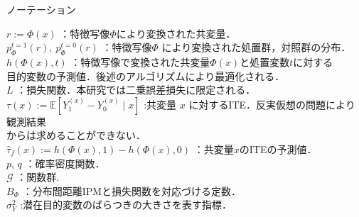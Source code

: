 \documentclass[dvipdfmx]{jreport}
\begin{document}
\begin{itembox}[l]{\large{ノーテーション}}
\begin{tabbing}
        \hspace{15pt} \raisebox{0.5ex}{\tiny $\bullet$} $r:=\Phi(x)$ \>：特徴写像$\Phi$により変換された共変量．\\[0.5em]
        \hspace{15pt} \raisebox{0.5ex}{\tiny $\bullet$} $p^{t=1}_\Phi(r),\ p^{t=0}_\Phi(r)$ \>：特徴写像$\Phi$ により変換された処置群，対照群の分布．\\[0.5em]
        \hspace{15pt} \raisebox{0.5ex}{\tiny $\bullet$} $h(\Phi(x), t)$ \> ：特徴写像で変換された共変量$\Phi(x)$と処置変数$t$に対する\\[0.5em]\>\hspace{6.5pt}目的変数の予測値．後述のアルゴリズムにより最適化される．\\[0.5em]
        \hspace{15pt} \raisebox{0.5ex}{\tiny $\bullet$} $L$ \>：損失関数．本研究では二乗誤差損失に限定される． \\[0.5em]
        \hspace{15pt} \raisebox{0.5ex}{\tiny $\bullet$} $\tau(x) := \mathbb{E}[Y_1^{(x)} - Y_0^{(x)} \mid x]$ \>:共変量 $x$ に対するITE．反実仮想の問題により観測結果\\[0.5em]\>\hspace{6.5pt}からは求めることができない．\\[0.5em]
        \hspace{15pt} \raisebox{0.5ex}{\tiny $\bullet$} $\hat{\tau}_f(x) := h(\Phi(x), 1) - h(\Phi(x), 0)$ \>：共変量$x$のITEの予測値． \\[0.5em]
        \hspace{15pt} \raisebox{0.5ex}{\tiny $\bullet$} $p$, $q$ \>：確率密度関数． \\[0.5em]
        \hspace{15pt} \raisebox{0.5ex}{\tiny $\bullet$} $\mathcal{G}$ \> ：関数群.\\[0.5em]
        \hspace{15pt} \raisebox{0.5ex}{\tiny $\bullet$} $B_\Phi$ \> ：分布間距離IPMと損失関数を対応づける定数．\\[0.5em]
        \hspace{15pt} \raisebox{0.5ex}{\tiny $\bullet$} $\sigma_Y^2$ \> :潜在目的変数のばらつきの大きさを表す指標．
    \end{tabbing}
\end{itembox}
\end{document}
